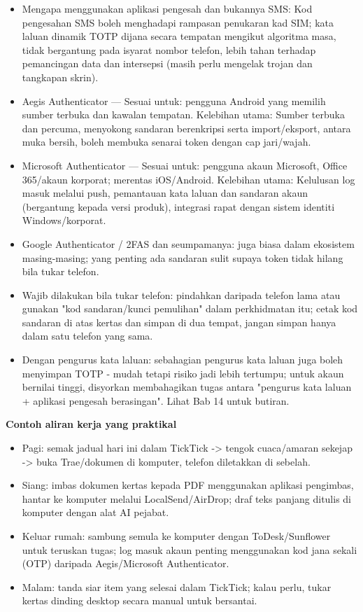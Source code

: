 \begin{itemize}
  \item Mengapa menggunakan aplikasi pengesah dan bukannya SMS: Kod pengesahan SMS boleh menghadapi rampasan penukaran kad SIM; kata laluan dinamik TOTP dijana secara tempatan mengikut algoritma masa, tidak bergantung pada isyarat nombor telefon, lebih tahan terhadap pemancingan data dan intersepsi (masih perlu mengelak trojan dan tangkapan skrin).
  \item Aegis Authenticator — Sesuai untuk: pengguna Android yang memilih sumber terbuka dan kawalan tempatan. Kelebihan utama: Sumber terbuka dan percuma, menyokong sandaran berenkripsi serta import/eksport, antara muka bersih, boleh membuka senarai token dengan cap jari/wajah.
  \item Microsoft Authenticator — Sesuai untuk: pengguna akaun Microsoft, Office 365/akaun korporat; merentas iOS/Android. Kelebihan utama: Kelulusan log masuk melalui push, pemantauan kata laluan dan sandaran akaun (bergantung kepada versi produk), integrasi rapat dengan sistem identiti Windows/korporat.
  \item Google Authenticator / 2FAS dan seumpamanya: juga biasa dalam ekosistem masing-masing; yang penting ada sandaran sulit supaya token tidak hilang bila tukar telefon.
  \item Wajib dilakukan bila tukar telefon: pindahkan daripada telefon lama atau gunakan "kod sandaran/kunci pemulihan" dalam perkhidmatan itu; cetak kod sandaran di atas kertas dan simpan di dua tempat, jangan simpan hanya dalam satu telefon yang sama.
  \item Dengan pengurus kata laluan: sebahagian pengurus kata laluan juga boleh menyimpan TOTP - mudah tetapi risiko jadi lebih tertumpu; untuk akaun bernilai tinggi, disyorkan membahagikan tugas antara "pengurus kata laluan + aplikasi pengesah berasingan". Lihat Bab 14 untuk butiran.
\end{itemize}


\textbf{Contoh aliran kerja yang praktikal}\par

\begin{itemize}
  \item Pagi: semak jadual hari ini dalam TickTick -> tengok cuaca/amaran sekejap -> buka Trae/dokumen di komputer, telefon diletakkan di sebelah.
  \item Siang: imbas dokumen kertas kepada PDF menggunakan aplikasi pengimbas, hantar ke komputer melalui LocalSend/AirDrop; draf teks panjang ditulis di komputer dengan alat AI pejabat.
  \item Keluar rumah: sambung semula ke komputer dengan ToDesk/Sunflower untuk teruskan tugas; log masuk akaun penting menggunakan kod jana sekali (OTP) daripada Aegis/Microsoft Authenticator.
  \item Malam: tanda siar item yang selesai dalam TickTick; kalau perlu, tukar kertas dinding desktop secara manual untuk bersantai.
\end{itemize}

